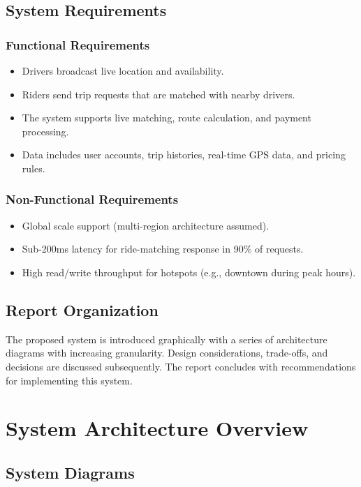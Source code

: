 \documentclass[12pt]{article}
\begin{document}
\subsection{System Requirements}

\subsubsection{Functional Requirements}
\begin{itemize}
    \item Drivers broadcast live location and availability.
    \item Riders send trip requests that are matched with nearby drivers.
    \item The system supports live matching, route calculation, and payment processing.
    \item Data includes user accounts, trip histories, real-time GPS data, and pricing rules.
\end{itemize}

\subsubsection{Non-Functional Requirements}
\begin{itemize}
    \item Global scale support (multi-region architecture assumed).
    \item Sub-200ms latency for ride-matching response in 90\% of requests.
    \item High read/write throughput for hotspots (e.g., downtown during peak hours).
\end{itemize}

\subsection{Report Organization}
The proposed system is introduced graphically with a series of architecture diagrams with increasing granularity. Design considerations, trade-offs, and decisions are discussed subsequently. The report concludes with recommendations for implementing this system.


\section{System Architecture Overview}
\label{sec:architecture-overview}

\subsection{System Diagrams}
\end{document}
